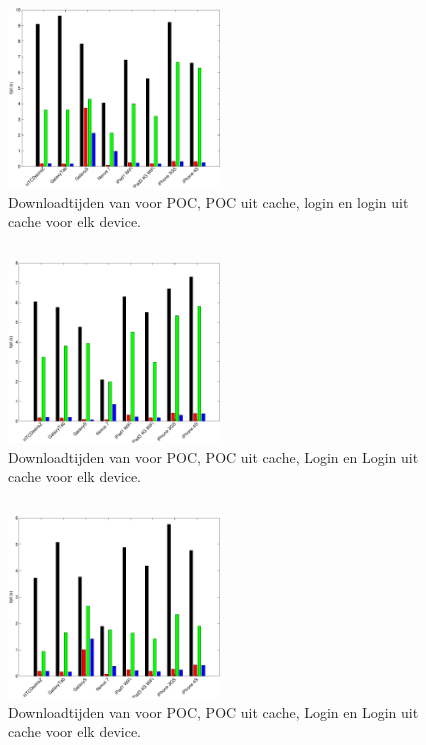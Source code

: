 \subsection{\kendo}

\begin{figure}[H]
  \centering
  \includegraphics[width=0.5\textwidth]{figuren/performance-kendo.pdf}
  \caption{Downloadtijden van \kendo{} voor POC,  POC uit cache,  login en login uit cache voor elk device.}
  \label{fig:performantie-kendo}
\end{figure}

\subsection{\jqm}

\begin{figure}[H]
  \centering
  \includegraphics[width=0.5\textwidth]{figuren/performance-jquery.pdf}
  \caption{Downloadtijden van \jqm{} voor POC,  POC uit cache,  Login en Login uit cache voor elk device.}
  \label{fig:performantie-jqm}
\end{figure}

\subsection{\lungo}

\begin{figure}[H]
  \centering
  \includegraphics[width=0.5\textwidth]{figuren/performance-lungo.pdf}
  \caption{Downloadtijden van \lungo{} voor POC,  POC uit cache,  Login en Login uit cache voor elk device.}
  \label{fig:performantie-lungo}
\end{figure}

